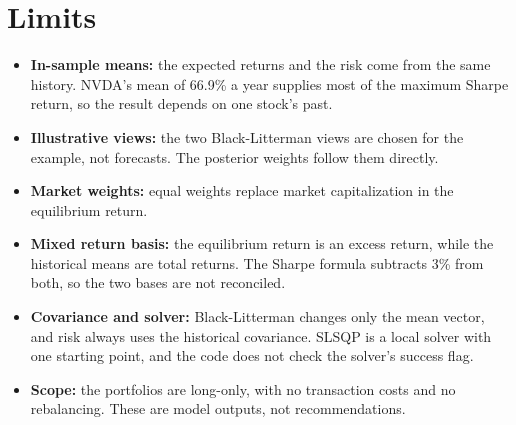 \documentclass[11pt,a4paper]{article}
\begin{document}
\section{Limits}
\begin{itemize}
\item \textbf{In-sample means:} the expected returns and the risk come from the same history. NVDA's mean of 66.9\% a year supplies most of the maximum Sharpe return, so the result depends on one stock's past.
\item \textbf{Illustrative views:} the two Black-Litterman views are chosen for the example, not forecasts. The posterior weights follow them directly.
\item \textbf{Market weights:} equal weights replace market capitalization in the equilibrium return.
\item \textbf{Mixed return basis:} the equilibrium return is an excess return, while the historical means are total returns. The Sharpe formula subtracts 3\% from both, so the two bases are not reconciled.
\item \textbf{Covariance and solver:} Black-Litterman changes only the mean vector, and risk always uses the historical covariance. SLSQP is a local solver with one starting point, and the code does not check the solver's success flag.
\item \textbf{Scope:} the portfolios are long-only, with no transaction costs and no rebalancing. These are model outputs, not recommendations.
\end{itemize}
\end{document}

